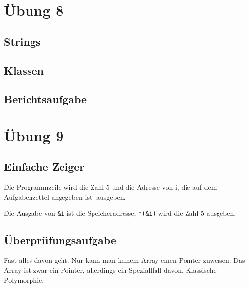\chapter{Übung 8}

\section{Strings}



\section{Klassen}





\section{Berichtsaufgabe}



\chapter{Übung 9}

\section{Einfache Zeiger}

Die Programmzeile wird die Zahl 5 und die Adresse von i, die auf dem Aufgabenzettel angegeben ist, ausgeben.

Die Ausgabe von \verb#&i# ist die Speicheradresse, \verb#*(&i)# wird die Zahl 5 ausgeben.

\section{Überprüfungsaufgabe}

Fast alles davon geht. Nur kann man keinem Array einen Pointer zuweisen. Das Array ist zwar ein Pointer, allerdings ein Speziallfall davon. Klassische Polymorphie.

